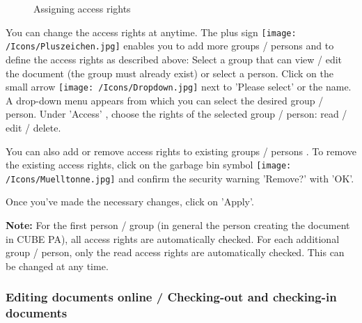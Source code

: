 \begin{figure}[H]
\caption{Assigning access rights}
\end{figure}

You can change the access rights at anytime. The plus sign \texttt{[image: /Icons/Pluszeichen.jpg]}  enables you to add more groups / persons and to define the access rights as described above: Select a group that can view / edit the document (the group must already exist) or select a person. Click on the small arrow \texttt{[image: /Icons/Dropdown.jpg]} next to 'Please select' or the name. A drop-down menu appears from which you can select the desired group / person. Under 'Access' , choose the rights of the selected group / person: read / edit / delete.

\vspace{\baselineskip}

You can also add or remove access rights to existing groups / persons . To remove the existing access rights, click on the garbage bin symbol \texttt{[image: /Icons/Muelltonne.jpg]}  and confirm the security warning 'Remove?' with 'OK'.  \newline

Once you've made the necessary changes, click on 'Apply'. 

\vspace{\baselineskip}

\textbf{Note:} For the first person / group (in general the person creating the document in CUBE PA), all access rights are automatically checked. For each additional group / person, only the read access rights are automatically checked. This can be changed at any time.


\subsubsection{Editing documents online / Checking-out and checking-in documents}
\label{bkm:Ref442780171}\label{bkm:Ref442776572}

